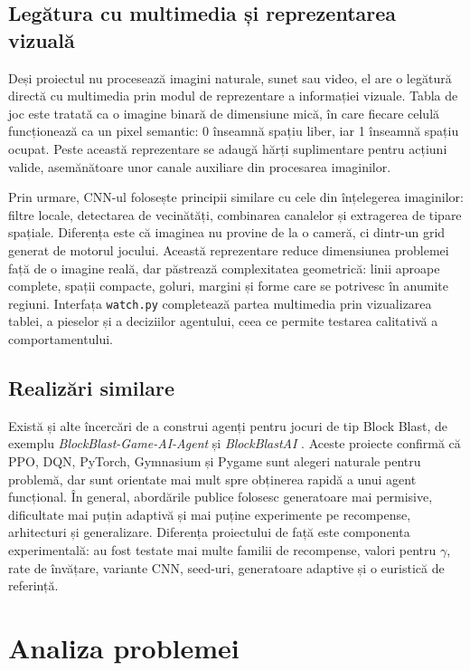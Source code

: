 \documentclass[12pt,a4paper]{article}
\begin{document}
\subsection{Legătura cu multimedia și reprezentarea vizuală}

Deși proiectul nu procesează imagini naturale, sunet sau video, el are o legătură directă cu multimedia prin modul de reprezentare a informației vizuale. Tabla de joc este tratată ca o imagine binară de dimensiune mică, în care fiecare celulă funcționează ca un pixel semantic: 0 înseamnă spațiu liber, iar 1 înseamnă spațiu ocupat. Peste această reprezentare se adaugă hărți suplimentare pentru acțiuni valide, asemănătoare unor canale auxiliare din procesarea imaginilor.

Prin urmare, CNN-ul folosește principii similare cu cele din înțelegerea imaginilor: filtre locale, detectarea de vecinătăți, combinarea canalelor și extragerea de tipare spațiale. Diferența este că imaginea nu provine de la o cameră, ci dintr-un grid generat de motorul jocului. Această reprezentare reduce dimensiunea problemei față de o imagine reală, dar păstrează complexitatea geometrică: linii aproape complete, spații compacte, goluri, margini și forme care se potrivesc în anumite regiuni. Interfața \texttt{watch.py} completează partea multimedia prin vizualizarea tablei, a pieselor și a deciziilor agentului, ceea ce permite testarea calitativă a comportamentului.

\subsection{Realizări similare}

Există și alte încercări de a construi agenți pentru jocuri de tip Block Blast, de exemplu \textit{BlockBlast-Game-AI-Agent} și \textit{BlockBlastAI} \cite{risticblockblast,zacharyblockblast}. Aceste proiecte confirmă că PPO, DQN, PyTorch, Gymnasium și Pygame sunt alegeri naturale pentru problemă, dar sunt orientate mai mult spre obținerea rapidă a unui agent funcțional. În general, abordările publice folosesc generatoare mai permisive, dificultate mai puțin adaptivă și mai puține experimente pe recompense, arhitecturi și generalizare. Diferența proiectului de față este componenta experimentală: au fost testate mai multe familii de recompense, valori pentru $\gamma$, rate de învățare, variante CNN, seed-uri, generatoare adaptive și o euristică de referință.

\section{Analiza problemei}
\end{document}
